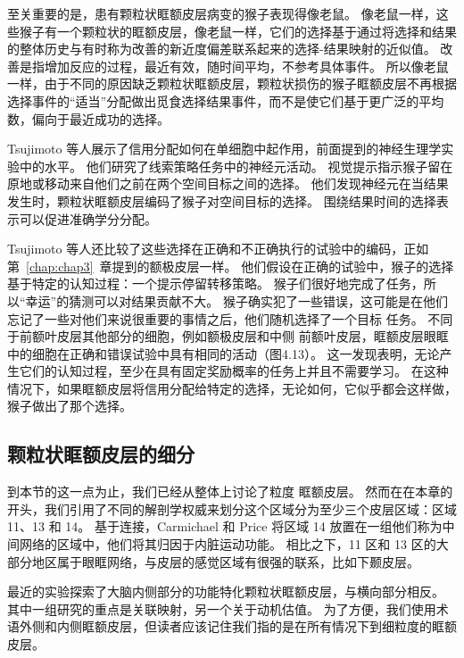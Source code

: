至关重要的是，患有颗粒状眶额皮层病变的猴子表现得像老鼠。
像老鼠一样，这些猴子有一个颗粒状的眶额皮层，像老鼠一样，它们的选择基于通过将选择和结果的整体历史与有时称为改善的新近度偏差联系起来的选择-结果映射的近似值\cite{herrnstein1991melioration}。
改善是指增加反应的过程，最近有效，随时间平均，不参考具体事件。
所以像老鼠一样，由于不同的原因缺乏颗粒状眶额皮层，颗粒状损伤的猴子眶额皮层不再根据选择事件的“适当”分配做出觅食选择结果事件，而不是使它们基于更广泛的平均数，偏向于最近成功的选择。\par


Tsujimoto 等人\cite{tsujimoto2009monkey}展示了信用分配如何在单细胞中起作用，前面提到的神经生理学实验中的水平。
他们研究了线索策略任务中的神经元活动。
视觉提示指示猴子留在原地或移动来自他们之前在两个空间目标之间的选择。
他们发现神经元在当结果发生时，颗粒状眶额皮层编码了猴子对空间目标的选择。
围绕结果时间的选择表示可以促进准确学分分配。\par


Tsujimoto 等人还比较了这些选择在正确和不正确执行的试验中的编码，正如第~\ref{chap:chap3}~章提到的额极皮层一样。
他们假设在正确的试验中，猴子的选择基于特定的认知过程：一个提示停留转移策略。
猴子们很好地完成了任务，所以“幸运”的猜测可以对结果贡献不大。
猴子确实犯了一些错误，这可能是在他们忘记了一些对他们来说很重要的事情之后，他们随机选择了一个目标
任务。
不同于前额叶皮层其他部分的细胞，例如额极皮层和中侧 前额叶皮层，眶额皮层眼眶中的细胞在正确和错误试验中具有相同的活动（图4.13）。
这一发现表明，无论产生它们的认知过程，至少在具有固定奖励概率的任务上并且不需要学习\cite{tsujimoto2011frontal}。
在这种情况下，如果眶额皮层将信用分配给特定的选择，无论如何，它似乎都会这样做，猴子做出了那个选择。\par



\subsection{颗粒状眶额皮层的细分}

到本节的这一点为止，我们已经从整体上讨论了粒度 眶额皮层。
然而在在本章的开头，我们引用了不同的解剖学权威来划分这个区域分为至少三个皮层区域：区域 11、13 和 14。
基于连接，Carmichael 和 Price 将区域 14 放置在一组他们称为中间网络的区域中，他们将其归因于内脏运动功能。
相比之下，11 区和 13 区的大部分地区属于眼眶网络，与皮层的感觉区域有很强的联系，比如下颞皮层。\par


最近的实验探索了大脑内侧部分的功能特化颗粒状眶额皮层，与横向部分相反。
其中一组研究的重点是关联映射，另一个关于动机估值。
为了方便，我们使用术语外侧和内侧眶额皮层，但读者应该记住我们指的是在所有情况下到细粒度的眶额皮层。\par


